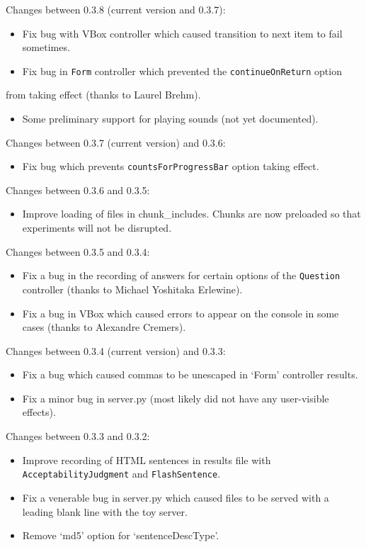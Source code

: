 \documentclass[11pt,letterpaper]{article}
\begin{document}
Changes between 0.3.8 (current version and 0.3.7):
\begin{itemize}

\item
 Fix bug with VBox controller which caused transition to next item to fail sometimes.
\item
 Fix bug in \texttt{Form} controller which prevented the \texttt{continueOnReturn} option
\end{itemize}
      from taking effect (thanks to Laurel Brehm).
\begin{itemize}

\item
 Some preliminary support for playing sounds (not yet documented).
\end{itemize}
Changes between 0.3.7 (current version) and 0.3.6:
\begin{itemize}

\item
 Fix bug which prevents \texttt{countsForProgressBar} option taking effect.
\end{itemize}
Changes between 0.3.6 and 0.3.5:
\begin{itemize}

\item
 Improve loading of files in chunk\_includes. Chunks are now preloaded so that experiments will not be disrupted.
\end{itemize}
Changes between 0.3.5 and 0.3.4:
\begin{itemize}

\item
 Fix a bug in the recording of answers for certain options of the \texttt{Question} controller (thanks to Michael Yoshitaka Erlewine).
\item
 Fix a bug in VBox which caused errors to appear on the console in some cases (thanks to Alexandre Cremers).
\end{itemize}
Changes between 0.3.4 (current version) and 0.3.3:
\begin{itemize}

\item
 Fix a bug which caused commas to be unescaped in `Form' controller results.
\item
 Fix a minor bug in server.py (most likely did not have any user-visible effects).
\end{itemize}
Changes between 0.3.3 and 0.3.2:
\begin{itemize}

\item
 Improve recording of HTML sentences in results file with \texttt{AcceptabilityJudgment} and \texttt{FlashSentence}.
\item
 Fix a venerable bug in server.py which caused files to be served with a leading blank line with the toy server.
\item
 Remove `md5' option for `sentenceDescType'.
\end{itemize}
\end{document}
